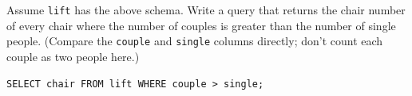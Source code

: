 \begin{blocksection}
\question Assume \lstinline{lift} has the above schema. Write a query that returns the chair number of every chair where the number of couples is greater than the number of single people. (Compare the \lstinline{couple} and \lstinline{single} columns directly; don't count each couple as two people here.)

\begin{solution}[1.5in]
\begin{lstlisting}
SELECT chair FROM lift WHERE couple > single;
\end{lstlisting}
\end{solution}
\end{blocksection}
